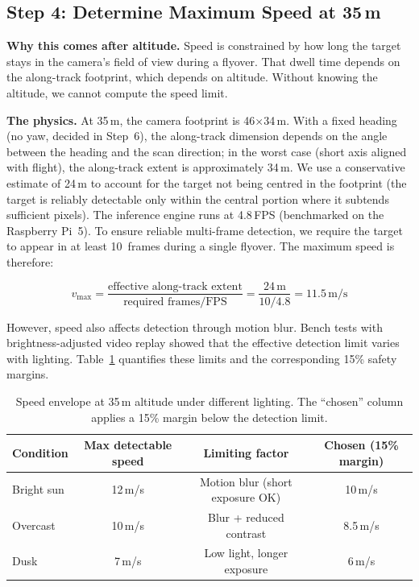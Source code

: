 \documentclass[10pt,a4paper]{article}
\newcommand{\compactTable}{\small\setlength{\tabcolsep}{3pt}\renewcommand{\arraystretch}{1.05}}
\begin{document}
\subsection{\texorpdfstring{Step 4: Determine Maximum Speed at 35\,m}{Step 4: Determine Maximum Speed at 35 m}}\label{sec:step4}

\textbf{Why this comes after altitude.} Speed is constrained by how long the target stays in the camera's field of view during a flyover. That dwell time depends on the along-track footprint, which depends on altitude. Without knowing the altitude, we cannot compute the speed limit.

\textbf{The physics.} At 35\,m, the camera footprint is 46$\times$34\,m. With a fixed heading (no yaw, decided in Step~6), the along-track dimension depends on the angle between the heading and the scan direction; in the worst case (short axis aligned with flight), the along-track extent is approximately 34\,m. We use a conservative estimate of 24\,m to account for the target not being centred in the footprint (the target is reliably detectable only within the central portion where it subtends sufficient pixels). The inference engine runs at 4.8\,FPS (benchmarked on the Raspberry Pi~5). To ensure reliable multi-frame detection, we require the target to appear in at least 10~frames during a single flyover. The maximum speed is therefore:

\[
v_{\max} = \frac{\text{effective along-track extent}}{\text{required frames} / \text{FPS}} = \frac{24\,\text{m}}{10 / 4.8} = 11.5\,\text{m/s}
\]

However, speed also affects detection through motion blur. Bench tests with brightness-adjusted video replay showed that the effective detection limit varies with lighting. Table~\ref{tab:df-speed-envelope} quantifies these limits and the corresponding 15\% safety margins.

\begin{table}[H]
  \centering\compactTable
  \caption{Speed envelope at 35\,m altitude under different lighting. The ``chosen'' column applies a 15\% margin below the detection limit.}\label{tab:df-speed-envelope}
  \begin{tabularx}{\linewidth}{@{}l c c c@{}}
    \toprule
    \textbf{Condition} & \textbf{Max detectable speed} & \textbf{Limiting factor} & \textbf{Chosen (15\% margin)} \\
    \midrule
    Bright sun   & 12\,m/s & Motion blur (short exposure OK) & 10\,m/s \\
    Overcast     & 10\,m/s & Blur + reduced contrast & 8.5\,m/s \\
    Dusk         &  7\,m/s & Low light, longer exposure & 6\,m/s \\
    \bottomrule
  \end{tabularx}
\end{table}
\end{document}
